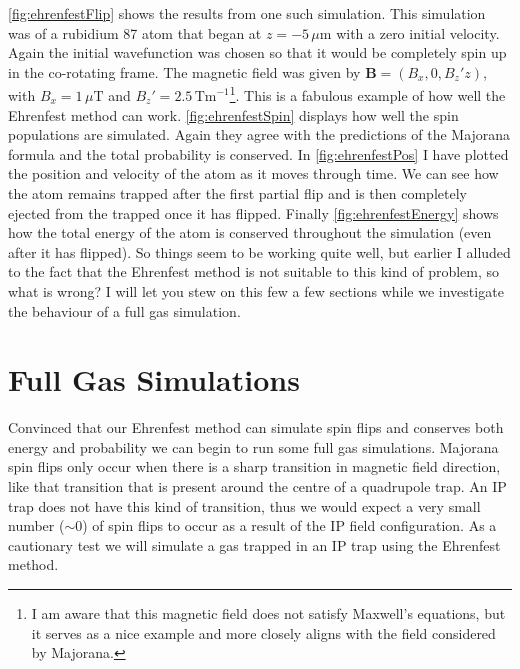 \autoref{fig:ehrenfestFlip} shows the results from one such simulation.
This simulation was of a rubidium 87 atom that began at $z=-5\,\mu\mathrm{m}$ with a zero initial velocity.
Again the initial wavefunction was chosen so that it would be completely spin up in the co-rotating frame.
The magnetic field was given by $\mathbf{B} = (B_x,0,B_z'z)$, with $B_x=1\,\mu\mathrm{T}$ and $B_z'=2.5\,\mathrm{Tm}^{-1}$\footnote{I am aware that this magnetic field does not satisfy Maxwell's equations, but it serves as a nice example and more closely aligns with the field considered by Majorana.}.
This is a fabulous example of how well the Ehrenfest method can work.
\autoref{fig:ehrenfestSpin} displays how well the spin populations are simulated.
Again they agree with the predictions of the Majorana formula and the total probability is conserved.
In \autoref{fig:ehrenfestPos} I have plotted the position and velocity of the atom as it moves through time.
We can see how the atom remains trapped after the first partial flip and is then completely ejected from the trapped once it has flipped.
Finally \autoref{fig:ehrenfestEnergy} shows how the total energy of the atom is conserved throughout the simulation (even after it has flipped).
So things seem to be working quite well, but earlier I alluded to the fact that the Ehrenfest method is not suitable to this kind of problem, so what is wrong?
I will let you stew on this few a few sections while we investigate the behaviour of a full gas simulation.


\section{Full Gas Simulations}

Convinced that our Ehrenfest method can simulate spin flips and conserves both energy and probability we can begin to run some full gas simulations.
Majorana spin flips only occur when there is a sharp transition in magnetic field direction, like that transition that is present around the centre of a quadrupole trap.
An IP trap does not have this kind of transition, thus we would expect a very small number ($\sim 0$) of spin flips to occur as a result of the IP field configuration.
As a cautionary test we will simulate a gas trapped in an IP trap using the Ehrenfest method.

